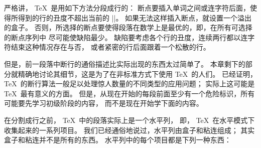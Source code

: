 严格讲， \TeX\ 是用如下方法分段成行的：
断点要插入单词之间或连字符后面，使得所得到的行的丑度不超出当前的 |\tolerance|。%
如果无法这样插入断点，就设置一个溢出的盒子。%
否则，所选择的断点要使得段落在数学上是最优的，即，在所有可选择的断点序列中%
尽可能使缺陷最少。%
缺陷要考虑各个行的丑度，连续两行都以连字符结束这种情况存在与否，
或者紧密的行后面跟着一个松散的行。

\danger 但是，前一段落中断行的通俗描述比实际出现的东西太过简单了。%
本章剩下的部分就精确地讨论其细节，这是为了在非标准方式下使用 \TeX\ 的人们。%
已经证明， \TeX\ 的断行算法一般足以处理惊人数量的不同类型的应用问题；
实际上这可能是 \TeX\ 最有意义的方面。%
但是，从现在开始的每段前面至少有一个危险标识，所有可能要先学习初级阶段的内容，
而不是现在开始学下面的内容。

\ninepoint
\danger 在分割成行之前， \TeX\ 中的段落实际上是一个{水平列}，
即， \TeX\ 在水平模式下收集起来的一系列项目。
我们已经通俗地说过，水平列由盒子和粘连组成；
其实盒子和粘连并不是所有的东西。
\1水平列中的每个项目都是下列一种东西：\enddanger

